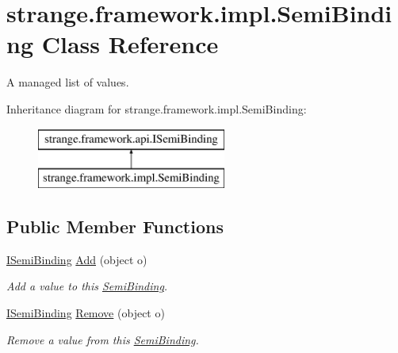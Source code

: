 \hypertarget{classstrange_1_1framework_1_1impl_1_1_semi_binding}{\section{strange.\-framework.\-impl.\-Semi\-Binding Class Reference}
\label{classstrange_1_1framework_1_1impl_1_1_semi_binding}
}


A managed list of values.  


Inheritance diagram for strange.\-framework.\-impl.\-Semi\-Binding\-:\begin{figure}[H]
\begin{center}
\leavevmode
\includegraphics[height=2.000000cm]{classstrange_1_1framework_1_1impl_1_1_semi_binding}
\end{center}
\end{figure}
\subsection*{Public Member Functions}
\begin{DoxyCompactItemize}
\item 
\hypertarget{classstrange_1_1framework_1_1impl_1_1_semi_binding_a3c825963eca73436961e31263374df37}{\hyperlink{interfacestrange_1_1framework_1_1api_1_1_i_semi_binding}{I\-Semi\-Binding} \hyperlink{classstrange_1_1framework_1_1impl_1_1_semi_binding_a3c825963eca73436961e31263374df37}{Add} (object o)}\label{classstrange_1_1framework_1_1impl_1_1_semi_binding_a3c825963eca73436961e31263374df37}

\begin{DoxyCompactList}\small\item\em Add a value to this \hyperlink{classstrange_1_1framework_1_1impl_1_1_semi_binding}{Semi\-Binding}. \end{DoxyCompactList}\item 
\hypertarget{classstrange_1_1framework_1_1impl_1_1_semi_binding_a6967b7a9d50e3a1f09aceb7ad62b6fc5}{\hyperlink{interfacestrange_1_1framework_1_1api_1_1_i_semi_binding}{I\-Semi\-Binding} \hyperlink{classstrange_1_1framework_1_1impl_1_1_semi_binding_a6967b7a9d50e3a1f09aceb7ad62b6fc5}{Remove} (object o)}\label{classstrange_1_1framework_1_1impl_1_1_semi_binding_a6967b7a9d50e3a1f09aceb7ad62b6fc5}

\begin{DoxyCompactList}\small\item\em Remove a value from this \hyperlink{classstrange_1_1framework_1_1impl_1_1_semi_binding}{Semi\-Binding}. \end{DoxyCompactList}\end{DoxyCompactItemize}

